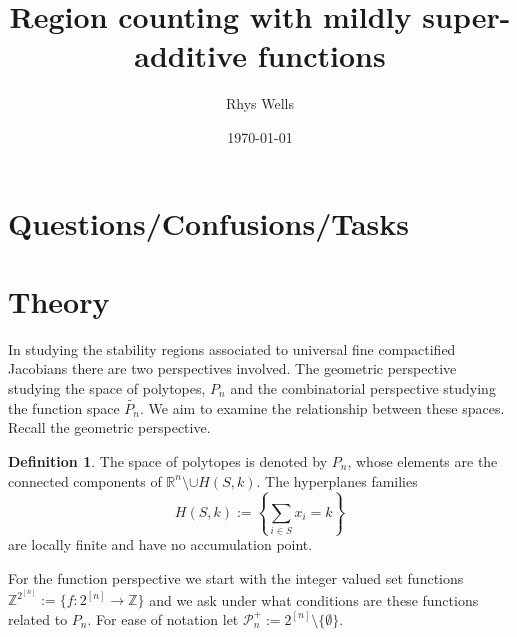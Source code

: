\documentclass[a4paper,12pt]{article}
\title{Region counting with mildly super-additive functions}
\author{Rhys Wells}
\date{\today}
\theoremstyle{definition}
\newtheorem{definition}{Definition}[section]
\theoremstyle{indented}
\begin{document}
\maketitle
\tableofcontents

\section{Questions/Confusions/Tasks}


\section{Theory}

In studying the stability regions associated to universal fine compactified Jacobians there are two perspectives involved. The geometric perspective studying the space of polytopes, $P_n$ and the combinatorial perspective studying the function space $\tilde{P_n}$. We aim to examine the relationship between these spaces. Recall the geometric perspective.      
\begin{definition}\label{polytopes}
The space of polytopes is denoted by $P_n$, whose elements are the connected components of $\mathbb{R}^n \setminus  \cup H(S,k)$. The hyperplanes families 
$$H(S,k):= \left\{ \sum_{i\in S} x_i = k \right\}$$
are locally finite and have no accumulation point.
\end{definition}



For the function perspective we start with the integer valued set functions $\mathbb{Z}^{2^{[n]}}:=\{ f: 2^{[n]} \rightarrow \mathbb{Z}\}$ and we ask under what conditions are these functions related to $P_n$. For ease of notation let $\mathcal{P}_n ^{+} := 2^{[n]} \setminus \{\emptyset\}$.
\end{document}
